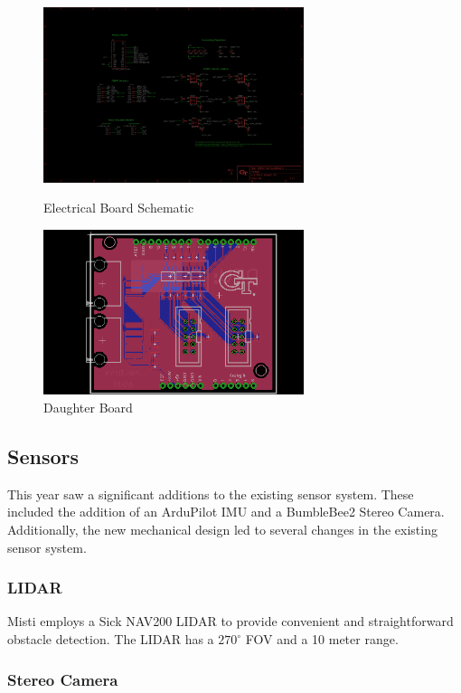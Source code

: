 \begin{figure}[H]
\begin{minipage}[b]{0.5\linewidth}
\centering
\includegraphics[width=3in]{./Pics/schematisch.png}
\caption{Electrical Board Schematic}
\label{FIG:Schematic}
\end{minipage}
\hspace{0.1in}
\begin{minipage}[b]{0.5\linewidth}
\centering
\includegraphics[width=3in]{./Pics/baord.png}
\caption{Daughter Board}
\label{FIG:Board}
\end{minipage}
\end{figure}

\subsection{Sensors}

This year saw a significant additions to the existing sensor system. These included the addition of an ArduPilot IMU and a BumbleBee2 Stereo Camera. Additionally, the new mechanical design led to several changes in the existing sensor system.
\subsubsection{LIDAR}

Misti employs a Sick NAV200 LIDAR to provide convenient and straightforward obstacle detection. The LIDAR has a $270^{\circ}$ FOV and a 10 meter range.

\subsubsection{Stereo Camera}


